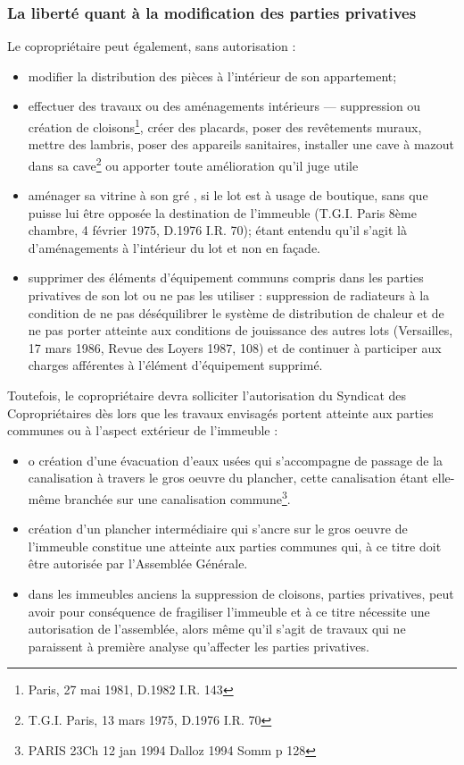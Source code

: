		\subsubsection{La liberté quant à la modification des parties privatives}
		
			Le copropriétaire peut également, sans autorisation :
			\begin{itemize}
				\item modifier la distribution des pièces à l'intérieur de son appartement;
				\item effectuer des travaux ou des aménagements intérieurs --- suppression ou création de cloisons\footnote{Paris, 27 mai 1981, D.1982 I.R. 143 }, créer des placards, poser des revêtements muraux, mettre des lambris, poser des appareils sanitaires, installer une cave à mazout dans sa cave\footnote{T.G.I. Paris, 13 mars 1975, D.1976 I.R. 70} ou apporter toute amélioration qu'il juge utile
				\item aménager sa vitrine à son gré , si le lot est à usage de boutique,  sans que puisse lui être opposée la destination de l'immeuble (T.G.I. Paris 8ème chambre, 4 février 1975, D.1976 I.R. 70); étant entendu qu'il s'agit là d'aménagements à l'intérieur du lot et non en façade.
				\item supprimer des éléments d'équipement communs compris dans les parties privatives de son lot ou ne pas les utiliser : suppression de radiateurs à la condition de ne pas déséquilibrer le système de distribution de chaleur et de ne pas porter atteinte aux conditions de jouissance des autres lots (Versailles, 17 mars 1986, Revue des Loyers 1987, 108) et de continuer à participer aux charges afférentes à l'élément d'équipement supprimé.
			\end{itemize}
		
			Toutefois, le copropriétaire devra solliciter l’autorisation du Syndicat des Copropriétaires dès lors que les travaux envisagés portent atteinte aux parties communes ou à l’aspect extérieur de l’immeuble :
			\begin{itemize}
				\item o création d’une évacuation d’eaux usées qui s’accompagne de passage de la canalisation à travers le gros oeuvre du plancher, cette canalisation étant elle-même branchée sur une canalisation commune\footnote{PARIS 23\degres Ch 12 jan 1994 Dalloz 1994 Somm p 128}.
				\item création d'un plancher intermédiaire qui s'ancre sur le gros oeuvre de l'immeuble constitue une atteinte aux parties communes qui, à ce titre doit être autorisée par l'Assemblée Générale.
				\item dans les immeubles anciens la suppression de cloisons, parties privatives, peut avoir pour conséquence de fragiliser l'immeuble et à ce titre nécessite une autorisation de l'assemblée, alors même qu'il s'agit de travaux qui ne paraissent à première analyse qu'affecter les parties privatives.
			\end{itemize}
			
